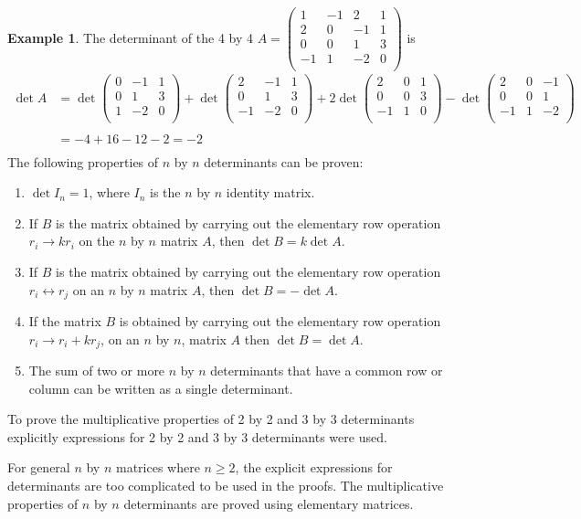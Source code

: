 \documentclass[11pt,a4paper]{article}
\theoremstyle{definition}
\newtheorem{exa}[thm]{Example}
\begin{document}
\begin{exa}
The determinant of the 4 by 4 $A=
\begin{pmatrix}
1&-1&2&1\\ 2&0&-1 &1\\ 0&0&1&3\\ -1&1&-2&0\\
\end{pmatrix}
$ is 
\begin{align*}
\det A &=\det
\begin{pmatrix}
0&-1&1\\0&1&3\\1&-2&0\\
\end{pmatrix}
+\det
\begin{pmatrix}
2&-1&1\\0&1&3\\-1&-2&0\\
\end{pmatrix}
+2\det
\begin{pmatrix}
2&0&1\\0&0&3\\-1&1&0\\
\end{pmatrix}
-\det
\begin{pmatrix}
2&0&-1\\0&0&1\\-1&1&-2\\
\end{pmatrix}\\\\
&=-4+16-12-2
=-2\\
\end{align*}
The following properties of $n$ by $n$ determinants can be proven:
\begin{enumerate}
\item $\det I_n=1$, where $I_n$ is the $n$ by $n$ identity matrix.
\item If $B$ is the matrix obtained by carrying out the elementary row operation $r_i\longrightarrow kr_i$ on the $n$ by $n$ matrix $A$, then $\det B=k\det A$.
\item If $B$ is the matrix obtained by carrying out the elementary row operation $r_i\longleftrightarrow r_j$ on an $n$ by $n$ matrix $A$, then $\det B=-\det A$.
\item If the matrix $B$ is obtained by carrying out the elementary row operation $r_i\longrightarrow r_i+kr_j$, on an $n$ by $n$, matrix $A$ then $\det B=\det A$.
\item The sum of two or more $n$ by $n$ determinants that have a common row or column can be written as a single determinant.
\end{enumerate}
To prove the multiplicative properties of 2 by 2 and 3 by 3 determinants explicitly expressions for 2 by 2 and 3 by 3 determinants were used.

For general $n$ by $n$ matrices where $n\geq 2$, the explicit expressions for determinants are too complicated to be used in the proofs. The multiplicative properties of $n$ by $n$ determinants are proved using elementary matrices.
\end{exa}
\end{document}
